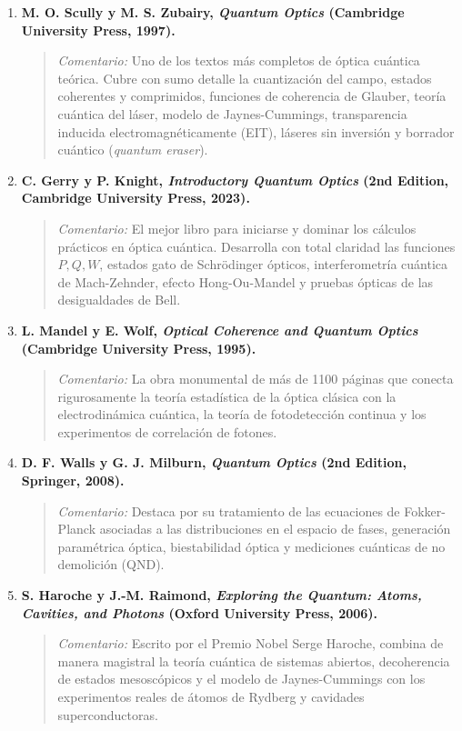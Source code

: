 \documentclass[11pt,a4paper,twoside]{report}
\theoremstyle{definition}
\theoremstyle{plain}
\theoremstyle{remark}
\begin{document}
\begin{enumerate}
    \item \textbf{M. O. Scully y M. S. Zubairy, \textit{Quantum Optics} (Cambridge University Press, 1997).}
    \begin{quote}
        \textit{Comentario:} Uno de los textos más completos de óptica cuántica teórica. Cubre con sumo detalle la cuantización del campo, estados coherentes y comprimidos, funciones de coherencia de Glauber, teoría cuántica del láser, modelo de Jaynes-Cummings, transparencia inducida electromagnéticamente (EIT), láseres sin inversión y borrador cuántico (\textit{quantum eraser}).
    \end{quote}

    \item \textbf{C. Gerry y P. Knight, \textit{Introductory Quantum Optics} (2nd Edition, Cambridge University Press, 2023).}
    \begin{quote}
        \textit{Comentario:} El mejor libro para iniciarse y dominar los cálculos prácticos en óptica cuántica. Desarrolla con total claridad las funciones $P, Q, W$, estados gato de Schrödinger ópticos, interferometría cuántica de Mach-Zehnder, efecto Hong-Ou-Mandel y pruebas ópticas de las desigualdades de Bell.
    \end{quote}

    \item \textbf{L. Mandel y E. Wolf, \textit{Optical Coherence and Quantum Optics} (Cambridge University Press, 1995).}
    \begin{quote}
        \textit{Comentario:} La obra monumental de más de 1100 páginas que conecta rigurosamente la teoría estadística de la óptica clásica con la electrodinámica cuántica, la teoría de fotodetección continua y los experimentos de correlación de fotones.
    \end{quote}

    \item \textbf{D. F. Walls y G. J. Milburn, \textit{Quantum Optics} (2nd Edition, Springer, 2008).}
    \begin{quote}
        \textit{Comentario:} Destaca por su tratamiento de las ecuaciones de Fokker-Planck asociadas a las distribuciones en el espacio de fases, generación paramétrica óptica, biestabilidad óptica y mediciones cuánticas de no demolición (QND).
    \end{quote}

    \item \textbf{S. Haroche y J.-M. Raimond, \textit{Exploring the Quantum: Atoms, Cavities, and Photons} (Oxford University Press, 2006).}
    \begin{quote}
        \textit{Comentario:} Escrito por el Premio Nobel Serge Haroche, combina de manera magistral la teoría cuántica de sistemas abiertos, decoherencia de estados mesoscópicos y el modelo de Jaynes-Cummings con los experimentos reales de átomos de Rydberg y cavidades superconductoras.
    \end{quote}


\end{enumerate}
\end{document}

